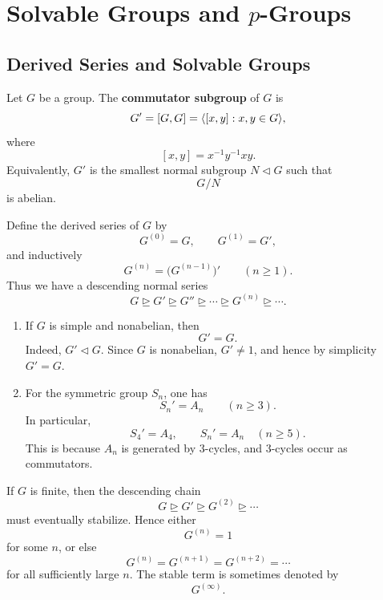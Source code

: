 \chapter{Solvable Groups and \texorpdfstring{$p$}{p}-Groups}

\section{Derived Series and Solvable Groups}

\begin{definition}
Let \(G\) be a group. The \textbf{commutator subgroup} of \(G\) is
\[
    G'=[G,G]
    =
    \langle [x,y]:x,y\in G\rangle,
\]
where
\[
    [x,y]=x^{-1}y^{-1}xy.
\]
Equivalently, \(G'\) is the smallest normal subgroup \(N\lhd G\) such that
\[
    G/N
\]
is abelian.
\end{definition}

\begin{definition}
Define the derived series of \(G\) by
\[
    G^{(0)}=G,
    \qquad
    G^{(1)}=G',
\]
and inductively
\[
    G^{(n)}=\bigl(G^{(n-1)}\bigr)'
    \qquad(n\geq 1).
\]
Thus we have a descending normal series
\[
    G\trianglerighteq G'\trianglerighteq G''\trianglerighteq
    \cdots
    \trianglerighteq G^{(n)}
    \trianglerighteq \cdots .
\]
\end{definition}

\begin{example}
\begin{enumerate}[label=(\arabic*)]
    \item If \(G\) is simple and nonabelian, then
    \[
        G'=G.
    \]
    Indeed, \(G'\lhd G\). Since \(G\) is nonabelian, \(G'\neq 1\), and hence by simplicity
    \(G'=G\).

    \item For the symmetric group \(S_n\), one has
    \[
        S_n'=A_n
        \qquad(n\geq 3).
    \]
    In particular,
    \[
        S_4'=A_4,
        \qquad
        S_n'=A_n \quad(n\geq 5).
    \]
    This is because \(A_n\) is generated by \(3\)-cycles, and \(3\)-cycles occur as commutators.
\end{enumerate}
\end{example}

\begin{remark}
If \(G\) is finite, then the descending chain
\[
    G\trianglerighteq G'\trianglerighteq G^{(2)}
    \trianglerighteq \cdots
\]
must eventually stabilize. Hence either
\[
    G^{(n)}=1
\]
for some \(n\), or else
\[
    G^{(n)}=G^{(n+1)}=G^{(n+2)}=\cdots
\]
for all sufficiently large \(n\). The stable term is sometimes denoted by
\[
    G^{(\infty)}.
\]
\end{remark}

